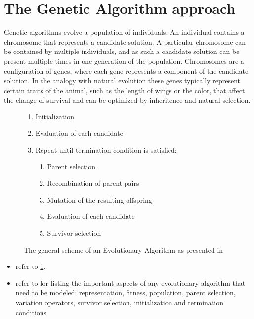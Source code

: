 \section{The Genetic Algorithm approach}
Genetic algorithms evolve a population of individuals. An individual contains a
chromosome that represents a candidate solution. A particular chromosome can be contained by
multiple individuals, and as such a candidate solution can be present multiple
times in one generation of the population. Chromosomes are a configuration of
genes, where each gene represents a component of the candidate solution. In the
analogy with natural evolution these genes typically represent certain traits
of the animal, such as the length of wings or the color, that affect the change
of survival and can be optimized by inheritence and natural selection.

\label{approach_genetic_algorithm}
\begin{figure}[ht!]
	\begin{framed}
		\begin{enumerate}
			\item Initialization
			\item Evaluation of each candidate
			\item Repeat until termination condition is satisfied:
				\begin{enumerate}
					\item Parent selection
					\item Recombination of parent pairs
					\item Mutation of the resulting offspring
					\item Evaluation of each candidate
					\item Survivor selection
				\end{enumerate}
		\end{enumerate}
	\end{framed}
	\caption[The evolutionary algorithm]{The general scheme of an
		Evolutionary Algorithm as presented in \citep{Eiben2007}}
	\label{alg:ea_scheme}
\end{figure}
\begin{itemize}
	\item refer to \ref{alg:ea_scheme}.
	\item refer to \citep{Eiben2007} for listing the important aspects of any evolutionary algorithm that need to be modeled: representation, fitness, population, parent selection, variation operators, survivor selection, initialization and termination conditions
\end{itemize}

